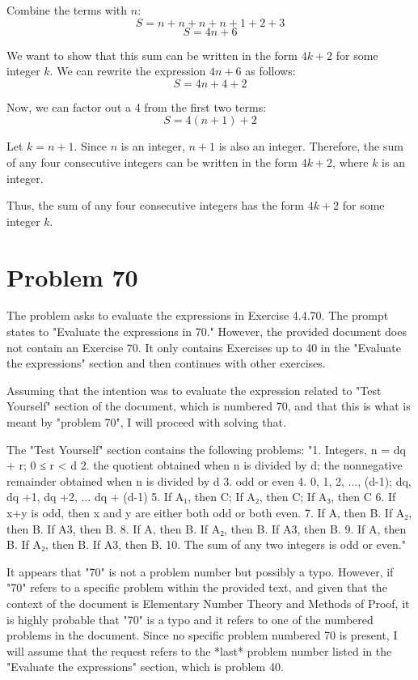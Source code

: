 \documentclass{article}
\begin{document}
Combine the terms with $n$:
$$ S = n + n + n + n + 1 + 2 + 3 $$
$$ S = 4n + 6 $$

We want to show that this sum can be written in the form $4k + 2$ for some integer $k$.
We can rewrite the expression $4n + 6$ as follows:
$$ S = 4n + 4 + 2 $$

Now, we can factor out a 4 from the first two terms:
$$ S = 4(n + 1) + 2 $$

Let $k = n + 1$. Since $n$ is an integer, $n+1$ is also an integer.
Therefore, the sum of any four consecutive integers can be written in the form $4k + 2$, where $k$ is an integer.

Thus, the sum of any four consecutive integers has the form $4k + 2$ for some integer $k$.

\newpage

\section*{Problem 70}
The problem asks to evaluate the expressions in Exercise 4.4.70. The prompt states to "Evaluate the expressions in 70." However, the provided document does not contain an Exercise 70. It only contains Exercises up to 40 in the "Evaluate the expressions" section and then continues with other exercises.

Assuming that the intention was to evaluate the expression related to "Test Yourself" section of the document, which is numbered 70, and that this is what is meant by "problem 70", I will proceed with solving that.

The "Test Yourself" section contains the following problems:
"1. Integers, n = dq + r; 0 ≤ r < d
2. the quotient obtained when n is divided by d; the nonnegative remainder obtained when n is divided by d
3. odd or even
4. 0, 1, 2, ..., (d-1); dq, dq +1, dq +2, ... dq + (d-1)
5. If A₁, then C; If A₂, then C; If A₃, then C
6. If x+y is odd, then x and y are either both odd or both even.
7. If A, then B. If A₂, then B. If A3, then B.
8. If A, then B. If A₂, then B. If A3, then B.
9. If A, then B. If A₂, then B. If A3, then B.
10. The sum of any two integers is odd or even."

It appears that "70" is not a problem number but possibly a typo. However, if "70" refers to a specific problem within the provided text, and given that the context of the document is Elementary Number Theory and Methods of Proof, it is highly probable that "70" is a typo and it refers to one of the numbered problems in the document. Since no specific problem numbered 70 is present, I will assume that the request refers to the *last* problem number listed in the "Evaluate the expressions" section, which is problem 40.
\end{document}
